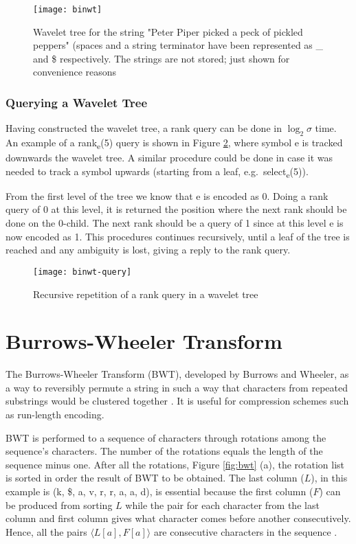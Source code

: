 \begin{figure}[h]
    \centering
    \texttt{[image: binwt]}
    \caption{Wavelet tree for the string "Peter Piper picked a peck of pickled peppers" (spaces and a string terminator have been represented as \_ and \$ respectively. The strings are not stored; just shown for convenience reasons}
    \label{fig:WT}
\end{figure}

\subsubsection{Querying a Wavelet Tree}
Having constructed the wavelet tree, a rank query can be done in \(\log_2\sigma\) time. An example of a rank\textsubscript{e}(5) query is shown in Figure \ref{fig:WT_Q}, where symbol e is tracked downwards the wavelet tree. A similar procedure could be done in case it was needed to track a symbol upwards (starting from a leaf, e.g.\ select\textsubscript{e}(5)).
\par From the first level of the tree we know that e is encoded as 0. Doing a rank query of 0 at this level, it is returned the position where the next rank should be done on the 0-child. The next rank should be a query of 1 since at this level e is now encoded as 1. This procedures continues recursively, until a leaf of the tree is reached and any ambiguity is lost, giving a reply to the rank query. 

\begin{figure}[h]
    \centering
    \texttt{[image: binwt-query]}
    \caption{Recursive repetition of a rank query in a wavelet tree}
    \label{fig:WT_Q}
\end{figure}


\newpage
\section{Burrows-Wheeler Transform} \label{App:BWT}
The Burrows-Wheeler Transform (BWT), developed by Burrows and Wheeler, as a way to reversibly permute a string in such a way that characters from repeated substrings would be clustered together \cite{adjeroh_bell_mukherjee_2008, bowe_2011_FM}. It is useful for compression schemes such as run-length encoding.
\par BWT is performed to a sequence of characters through rotations among the sequence’s characters. The number of the rotations equals the length of the sequence minus one. After all the rotations, Figure \ref{fig:bwt} (a), the rotation list is sorted in order the result of BWT to be obtained. The last column (\(L\)), in this example is (k, \$, a, v, r, r, a, a, d), is essential because the first column (\(F\)) can be produced from sorting \(L\) while the pair for each character from the last column and first column gives what character comes before another consecutively. Hence, all the pairs \(\langle L[a], F[a] \rangle\) are consecutive characters in the sequence \cite{adjeroh_bell_mukherjee_2008}.


